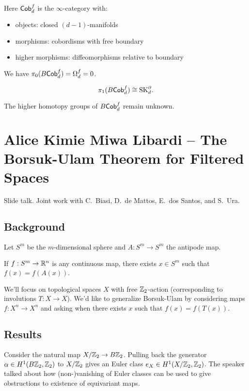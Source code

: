 \documentclass{amsart}
\begin{document}
Here $\mathsf{Cob}_d^f$ is the $\infty$-category with:
\begin{itemize}
  \item objects: closed $(d-1)$-manifolds
  \item morphisms: cobordisms with free boundary
  \item higher morphisms: diffeomorphisms relative to boundary
\end{itemize}
We have $\pi_0(B\mathsf{Cob}_d^f) = \Omega_d^f= 0$.

\begin{prop}
  \[
    \pi_1(B\mathsf{Cob}_d^f) \cong \mathrm{SK}_d^\partial.
  \]
\end{prop}

The higher homotopy groups of $B\mathsf{Cob}_d^f$ remain unknown.

\section{Alice Kimie Miwa Libardi -- The Borsuk-Ulam Theorem for Filtered Spaces}

Slide talk.
Joint work with C.\ Biasi, D.\ de Mattos, E.\ dos Santos, and S.\ Ura.

\subsection{Background}

Let $S^m$ be the $m$-dimensional sphere and $A: S^m \to S^m$ the antipode map.

\begin{thm}
  If $f: S^m \to \mathbb{R}^n$ is any continuous map, there exists $x \in S^m$ such that $f(x) = f(A(x))$.
\end{thm}

We'll focus on topological spaces $X$ with free $\mathbb{Z}_2$-action (corresponding to involutions $T: X \to X$).
We'd like to generalize Borsuk-Ulam by considering maps $f: X^n \to X^n$ and asking when there exists $x$ such that $f(x) = f(T(x))$.

\subsection{Results}

Consider the natural map $X/\mathbb{Z}_2 \to B\mathbb{Z}_2$.
Pulling back the generator $\alpha \in H^1(B\mathbb{Z}_2, \mathbb{Z}_2)$ to $X/\mathbb{Z}_2$ gives an Euler class $e_X \in H^1(X/\mathbb{Z}_2, \mathbb{Z}_2)$.
The speaker talked about how (non-)vanishing of Euler classes can be used to give obstructions to existence of equivariant maps.
\end{document}
